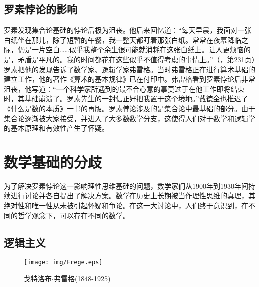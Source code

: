 \documentclass{article}
\begin{document}
\subsection{罗素悖论的影响}

罗素发现集合论基础的悖论后极为沮丧。他后来回忆道：“每天早晨，我面对一张白纸坐在那儿，除了短暂的午餐，我一整天都盯着那张白纸。常常在夜幕降临之际，仍是一片空白……似乎我整个余生很可能就消耗在这张白纸上。让人更烦恼的是，矛盾是平凡的。我的时间都花在这些似乎不值得考虑的事情上。”（\cite{HanXueTao16}，第231页）罗素把他的发现告诉了数学家、逻辑学家弗雷格。当时弗雷格正在进行算术基础的建立工作，他的著作《算术的基本规律》已在付印中。弗雷格看到罗素悖论后非常沮丧，他写道：“一个科学家所遇到的最不合心意的事莫过于在他工作即将结束时，其基础崩溃了。罗素先生的一封信正好把我置于这个境地。”戴徳金也推迟了《什么是数的本质》一书的再版。罗素悖论涉及的是集合论中最基础的部分。由于集合论逐渐被大家接受，并进入了大多数数学分支，这使得人们对于数学和逻辑学的基本原理和有效性产生了怀疑。

\begin{Exercise}
\end{Exercise}

\section{数学基础的分歧}

为了解决罗素悖论这一影响理性思维基础的问题，数学家们从1900年到1930年间持续进行讨论并各自提出了解决方案。数学在历史上长期被当作理性思维的真理，其绝对性和唯一性从未被引起怀疑和争论。在这一大讨论中，人们终于意识到，在不同的哲学观念下，可以存在不同的数学。

\subsection{逻辑主义}

\begin{wrapfigure}{L}{0.3\textwidth}
 \centering
 \texttt{[image: img/Frege.eps]}
 \captionsetup{labelformat=empty}
 \caption{戈特洛布$\cdot$弗雷格(1848-1925)}
 \label{fig:Frege}
\end{wrapfigure}
\end{document}
